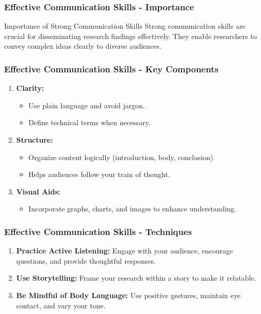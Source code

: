 \documentclass[aspectratio=169]{beamer}
\begin{document}
\begin{frame}[fragile]
    \frametitle{Effective Communication Skills - Importance}
    \begin{block}{Importance of Strong Communication Skills}
        Strong communication skills are crucial for disseminating research findings effectively. 
        They enable researchers to convey complex ideas clearly to diverse audiences.
    \end{block}
\end{frame}

\begin{frame}[fragile]
    \frametitle{Effective Communication Skills - Key Components}
    \begin{enumerate}
        \item \textbf{Clarity:} 
            \begin{itemize}
                \item Use plain language and avoid jargon.
                \item Define technical terms when necessary.
            \end{itemize}
        \item \textbf{Structure:} 
            \begin{itemize}
                \item Organize content logically (introduction, body, conclusion).
                \item Helps audiences follow your train of thought.
            \end{itemize}
        \item \textbf{Visual Aids:} 
            \begin{itemize}
                \item Incorporate graphs, charts, and images to enhance understanding.
            \end{itemize}
    \end{enumerate}
\end{frame}

\begin{frame}[fragile]
    \frametitle{Effective Communication Skills - Techniques}
    \begin{enumerate}
        \item \textbf{Practice Active Listening:} 
            Engage with your audience, encourage questions, and provide thoughtful responses.
        \item \textbf{Use Storytelling:} 
            Frame your research within a story to make it relatable.
        \item \textbf{Be Mindful of Body Language:} 
            Use positive gestures, maintain eye contact, and vary your tone.
    \end{enumerate}
\end{frame}
\end{document}

